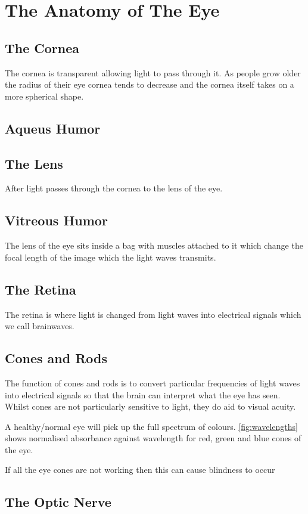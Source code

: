
\chapter{The Anatomy of The Eye}

\label{anatomy} %


\section{The Cornea}

The cornea is transparent allowing light to pass through it.\cite{jester1999cellular,hassell2010molecular}
As people grow older the radius of their eye cornea tends to decrease and the
cornea itself takes on a more spherical shape.\cite{guirao2000optical}

\section{Aqueus Humor}

\section{The Lens}
After light passes through the cornea to the lens of the eye.

\section{Vitreous Humor}

The lens of the eye sits inside a bag with muscles attached to it which change
the focal length of the image which the light waves transmits.

\section{The Retina}
The retina is where light is changed from light waves into electrical signals
which we call brainwaves.

\section{Cones and Rods}

The function of cones and rods is to convert particular frequencies of light
waves
into electrical signals so that the brain can interpret what the eye has seen.
Whilst cones are not particularly sensitive to light, they do aid to visual
acuity.
\cite{}

A healthy/normal eye will pick up the full spectrum of colours.
\ref{fig:wavelengths} shows normalised absorbance against wavelength for red,
green and blue cones of the eye.

If all the eye cones are not working then this can cause
blindness to occur\cite{}

\section{The Optic Nerve}

